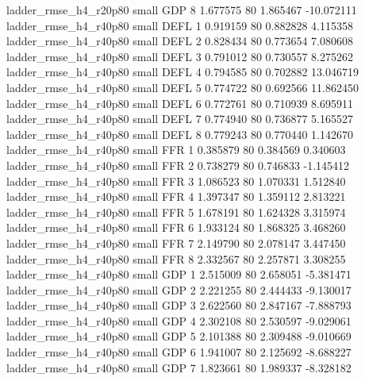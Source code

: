    ladder_rmse_h4_r20p80      small      GDP                 8 1.677575 80       1.865467         -10.072111
   ladder_rmse_h4_r40p80      small     DEFL                 1 0.919159 80       0.882828           4.115358
   ladder_rmse_h4_r40p80      small     DEFL                 2 0.828434 80       0.773654           7.080608
   ladder_rmse_h4_r40p80      small     DEFL                 3 0.791012 80       0.730557           8.275262
   ladder_rmse_h4_r40p80      small     DEFL                 4 0.794585 80       0.702882          13.046719
   ladder_rmse_h4_r40p80      small     DEFL                 5 0.774722 80       0.692566          11.862450
   ladder_rmse_h4_r40p80      small     DEFL                 6 0.772761 80       0.710939           8.695911
   ladder_rmse_h4_r40p80      small     DEFL                 7 0.774940 80       0.736877           5.165527
   ladder_rmse_h4_r40p80      small     DEFL                 8 0.779243 80       0.770440           1.142670
   ladder_rmse_h4_r40p80      small      FFR                 1 0.385879 80       0.384569           0.340603
   ladder_rmse_h4_r40p80      small      FFR                 2 0.738279 80       0.746833          -1.145412
   ladder_rmse_h4_r40p80      small      FFR                 3 1.086523 80       1.070331           1.512840
   ladder_rmse_h4_r40p80      small      FFR                 4 1.397347 80       1.359112           2.813221
   ladder_rmse_h4_r40p80      small      FFR                 5 1.678191 80       1.624328           3.315974
   ladder_rmse_h4_r40p80      small      FFR                 6 1.933124 80       1.868325           3.468260
   ladder_rmse_h4_r40p80      small      FFR                 7 2.149790 80       2.078147           3.447450
   ladder_rmse_h4_r40p80      small      FFR                 8 2.332567 80       2.257871           3.308255
   ladder_rmse_h4_r40p80      small      GDP                 1 2.515009 80       2.658051          -5.381471
   ladder_rmse_h4_r40p80      small      GDP                 2 2.221255 80       2.444433          -9.130017
   ladder_rmse_h4_r40p80      small      GDP                 3 2.622560 80       2.847167          -7.888793
   ladder_rmse_h4_r40p80      small      GDP                 4 2.302108 80       2.530597          -9.029061
   ladder_rmse_h4_r40p80      small      GDP                 5 2.101388 80       2.309488          -9.010669
   ladder_rmse_h4_r40p80      small      GDP                 6 1.941007 80       2.125692          -8.688227
   ladder_rmse_h4_r40p80      small      GDP                 7 1.823661 80       1.989337          -8.328182
